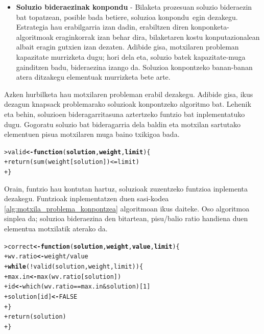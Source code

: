 \documentclass[eu]{ifirak}\usepackage[]{graphicx}\usepackage[]{color}
\makeatletter
\newcommand{\hlnum}[1]{\textcolor[rgb]{0.659,0.4,0.051}{#1}}%
\newcommand{\hlopt}[1]{\textcolor[rgb]{0,0,0}{#1}}%
\newcommand{\hlstd}[1]{\textcolor[rgb]{0,0,0}{#1}}%
\newcommand{\hlkwa}[1]{\textcolor[rgb]{0.133,0.224,0.659}{\textbf{#1}}}%
\newcommand{\hlkwb}[1]{\textcolor[rgb]{0.549,0.114,0.412}{\textbf{#1}}}%
\newcommand{\hlkwc}[1]{\textcolor[rgb]{0.659,0.573,0.133}{\textbf{#1}}}%
\newcommand{\hlkwd}[1]{\textcolor[rgb]{0.659,0.133,0.482}{#1}}%
\newenvironment{kframe}{%
 \def\at@end@of@kframe{}%
 \ifinner\ifhmode%
  \def\at@end@of@kframe{\end{minipage}}%
  \begin{minipage}{\columnwidth}%
 \fi\fi%
 \def\FrameCommand##1{\hskip\@totalleftmargin \hskip-\fboxsep
 \colorbox{shadecolor}{##1}\hskip-\fboxsep
     \hskip-\linewidth \hskip-\@totalleftmargin \hskip\columnwidth}%
 \MakeFramed {\advance\hsize-\width
   \@totalleftmargin\z@ \linewidth\hsize
   \@setminipage}}%
 {\par\unskip\endMakeFramed%
 \at@end@of@kframe}
\newenvironment{knitrout}{}{} %
\newcommand{\zkk}{\guillemotleft}
\newcommand{\skk}{\guillemotright}
\makeatother
\begin{document}
\begin{itemize}
\item \textbf{Soluzio bideraezinak konpondu} - Bilaketa prozesuan soluzio bideraezin bat topatzean, posible bada betiere, soluzioa \zkk konpondu\skk\ egin dezakegu. Estrategia hau erabilgarria izan dadin, erabiltzen diren konponketa-algoritmoak eraginkorrak izan behar dira, bilaketaren kostu konputazionalean albait eragin gutxien izan dezaten. Adibide gisa, motxilaren probleman kapazitate murrizketa dugu; hori dela eta, soluzio batek kapazitate-muga gainditzen badu, bideraezina izango da. Soluzioa konpontzeko banan-banan atera ditzakegu elementuak murrizketa bete arte.
\end{itemize}

Azken hurbilketa hau motxilaren probleman erabil dezakegu. Adibide gisa, ikus dezagun knapsack problemarako soluzioak konpontzeko algoritmo bat. Lehenik eta behin, soluzioen bideragarritasuna aztertzeko funtzio bat inplementatuko dugu. Gogoratu soluzio bat bideragarria dela baldin eta motxilan sartutako elementuen pisua motxilaren muga baino txikigoa bada.

\begin{knitrout}
\color{fgcolor}\begin{kframe}
\begin{alltt}
\hlstd{> }\hlstd{valid} \hlkwb{<-} \hlkwa{function}\hlstd{(}\hlkwc{solution}\hlstd{,} \hlkwc{weight}\hlstd{,} \hlkwc{limit}\hlstd{) \{}
\hlstd{+ }    \hlkwd{return}\hlstd{(}\hlkwd{sum}\hlstd{(weight[solution])} \hlopt{<=} \hlstd{limit)}
\hlstd{+ }\hlstd{\}}
\end{alltt}
\end{kframe}
\end{knitrout}

Orain, funtzio hau kontutan hartuz, soluzioak zuzentzeko funtzioa inplementa dezakegu. Funtzioak inplementatzen duen sasi-kodea \ref{alg:motxila_problema_konpontzea} algoritmoan ikus daiteke. Oso algoritmoa sinplea da; soluzioa bideraezina den bitartean, pisu/balio ratio handiena duen elementua motxilatik aterako da. 

\begin{knitrout}
\color{fgcolor}\begin{kframe}
\begin{alltt}
\hlstd{> }\hlstd{correct} \hlkwb{<-} \hlkwa{function}\hlstd{(}\hlkwc{solution}\hlstd{,} \hlkwc{weight}\hlstd{,} \hlkwc{value}\hlstd{,} \hlkwc{limit}\hlstd{) \{}
\hlstd{+ }  \hlstd{wv.ratio} \hlkwb{<-} \hlstd{weight} \hlopt{/} \hlstd{value}
\hlstd{+ }  \hlkwa{while}\hlstd{(}\hlopt{!}\hlkwd{valid}\hlstd{(solution, weight, limit)) \{}
\hlstd{+ }    \hlstd{max.in} \hlkwb{<-} \hlkwd{max}\hlstd{(wv.ratio[solution])}
\hlstd{+ }    \hlstd{id} \hlkwb{<-} \hlkwd{which}\hlstd{(wv.ratio} \hlopt{==} \hlstd{max.in} \hlopt{&} \hlstd{solution)[}\hlnum{1}\hlstd{]}
\hlstd{+ }    \hlstd{solution[id]} \hlkwb{<-} \hlnum{FALSE}
\hlstd{+ }  \hlstd{\}}
\hlstd{+ }  \hlkwd{return}\hlstd{(solution)}
\hlstd{+ }\hlstd{\}}
\end{alltt}
\end{kframe}
\end{knitrout}
\end{document}

